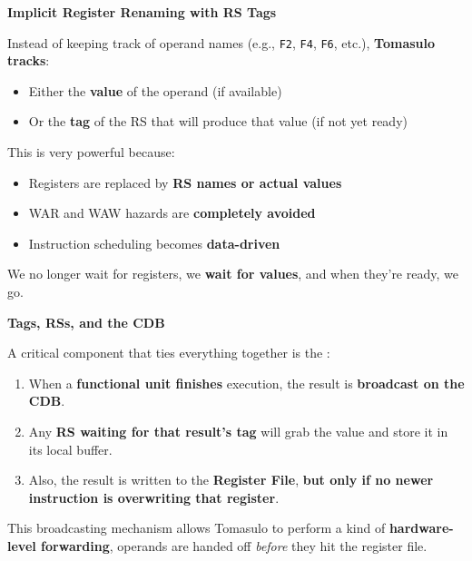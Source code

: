 \highspace
\begin{flushleft}
    \textcolor{Green3}{ \textbf{Implicit Register Renaming with RS Tags}}
\end{flushleft}
Instead of keeping track of operand names (e.g., \texttt{F2}, \texttt{F4}, \texttt{F6}, etc.), \textbf{Tomasulo tracks}:
\begin{itemize}
    \item Either the \textbf{value} of the operand (if available)
    \item Or the \textbf{tag} of the RS that will produce that value (if not yet ready)
\end{itemize}
This is very powerful because:
\begin{itemize}[label=\textcolor{Green3}{}]
    \item Registers are replaced by \textbf{RS names or actual values}
    \item WAR and WAW hazards are \textbf{completely avoided}
    \item Instruction scheduling becomes \textbf{data-driven}
\end{itemize}
We no longer wait for registers, we \textbf{wait for values}, and when they're ready, we go.

\highspace
\begin{flushleft}
    \textcolor{Green3}{ \textbf{Tags, RSs, and the CDB}}
\end{flushleft}
A critical component that ties everything together is the :
\begin{enumerate}
    \item When a \textbf{functional unit finishes} execution, the result is \textbf{broadcast on the CDB}.
    \item Any \textbf{RS waiting for that result's tag} will grab the value and store it in its local buffer.
    \item Also, the result is written to the \textbf{Register File}, \textbf{but only if no newer instruction is overwriting that register}.
\end{enumerate}
This broadcasting mechanism allows Tomasulo to perform a kind of \textbf{hardware-level forwarding}, operands are handed off \emph{before} they hit the register file.

